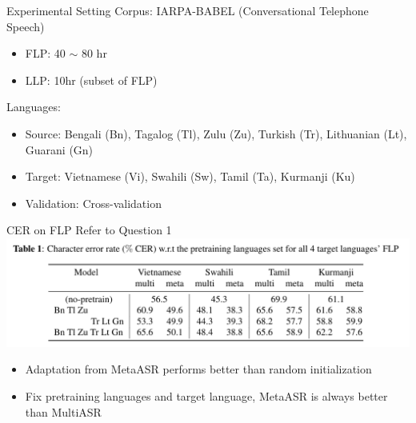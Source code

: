 \documentclass{beamer}
\begin{document}
\begin{frame}[t]{Experimental Setting}
  Corpus: IARPA-BABEL (Conversational Telephone Speech)
  \begin{itemize}
    \item FLP: 40 $\sim$ 80 hr
    \item LLP: 10hr (subset of FLP)
  \end{itemize}
  \pause
  Languages:
  \begin{itemize}
    \item Source: Bengali (Bn), Tagalog (Tl), Zulu (Zu), Turkish (Tr), Lithuanian (Lt), Guarani (Gn)
    \item Target: Vietnamese (Vi), Swahili (Sw), Tamil (Ta), Kurmanji (Ku)
    \item Validation: Cross-validation
  \end{itemize}
\end{frame}

\begin{frame}[t]{CER on FLP}
  Refer to Question 1
  \center \includegraphics[width=1.0\textwidth]{fig/flp_table.png}

  \begin{itemize}
    \item Adaptation from MetaASR performs better than random initialization
    \item Fix pretraining languages and target language, MetaASR is always better than MultiASR
  \end{itemize}
\end{frame}


\end{document}
